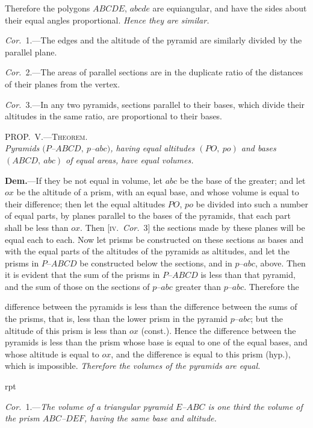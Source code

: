 \documentclass[oneside]{book}
\newcounter{wrapwidth}
\newcommand\myprop[2]{
\bigskip\Needspace*{4\baselineskip}\begin{center}\textsc{#1}\\\medskip\emph{#2}\par\end{center}
}
\newcommand\imgflow[3]{
\setcounter{wrapwidth}{#1}

\begin{wrapfigure}[#2]{r}{\value{wrapwidth}pt}
\begin{center}
\vspace{-0.3in}

\end{center}
\end{wrapfigure}
}
\newcommand\imgcent[2]{
\begin{center}

\end{center}
}
\begin{document}
Therefore the polygons $ABCDE$, $abcde$ are equiangular,
and have the sides about their equal angles proportional.
\emph{Hence they are similar.}

\emph{Cor.}~1.---The edges and the altitude of the pyramid
are similarly divided by the parallel plane.

\emph{Cor.}~2.---The areas of parallel sections are in the
duplicate ratio of the distances of their planes from the
vertex.

\emph{Cor.}~3.---In any two pyramids, sections parallel to
their bases, which divide their altitudes in the same
ratio, are proportional to their bases.



\myprop{PROP\@.~V.---Theorem.}{Pyramids $(P$--$ABCD,\ p$--$abc)$, having equal altitudes
$(PO,\ po)$ and bases $(ABCD,\ abc)$ of equal areas, have equal
volumes.}


\imgcent{298}{f242}

\textbf{Dem.}---If they be not equal in volume, let $abc$ be
the base of the greater; and let $ox$ be the altitude of a
prism, with an equal base, and whose volume is equal
to their difference; then let the equal altitudes $PO$, $po$
be divided into such a number of equal parts, by planes
parallel to the bases of the pyramids, that each part
shall be less than $ox$. Then [\textsc{iv.}\ \emph{Cor.}~3] the sections
made by these planes will be equal each to each. Now
let prisms be constructed on these sections as bases and
with the equal parts of the altitudes of the pyramids as
altitudes, and let the prisms in $P$--$ABCD$ be constructed
below the sections, and in $p$--$abc$, above. Then it is
evident that the sum of the prisms in $P$--$ABCD$ is
less than that pyramid, and the sum of those on the
sections of $p$--$abc$ greater than $p$--$abc$. Therefore the

difference between the pyramids is less than the difference
between the sums of the prisms, that is, less than
the lower prism in the pyramid $p$--$abc$; but the altitude
of this prism is less than $ox$ (const.). Hence the difference
between the pyramids is less than the prism
whose base is equal to one of the equal bases, and
whose altitude is equal to $ox$, and the difference is
equal to this prism (hyp.), which is impossible. \emph{Therefore
the volumes of the pyramids are equal.}


\imgflow{113}{13}{f243}

\emph{Cor.}~1.---\textit{The volume of a triangular pyramid $E$--$ABC$
is one third the volume of the prism
$ABC$--$DEF$, having the same base
and altitude.}
\end{document}
